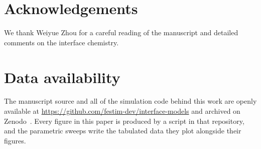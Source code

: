\documentclass[5p]{elsarticle}
\begin{document}
\section*{Acknowledgements}

We thank Weiyue Zhou for a careful reading of the manuscript and detailed comments on the interface chemistry.

\section{Data availability}

The manuscript source and all of the simulation code behind this work are openly available at \url{https://github.com/festim-dev/interface-models} and archived on Zenodo~\cite{remi_delaporte_mathurin_2026_22112697}.
Every figure in this paper is produced by a script in that repository, and the parametric sweeps write the tabulated data they plot alongside their figures.


\appendix



\end{document}
